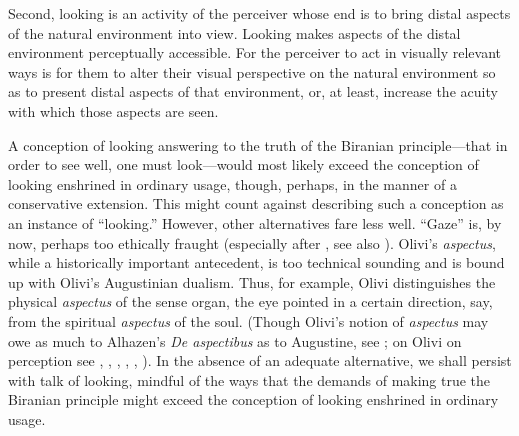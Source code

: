 Second, looking is an activity of the perceiver whose end is to bring distal aspects of the natural environment into view. Looking makes aspects of the distal environment perceptually accessible. For the perceiver to act in visually relevant ways is for them to alter their visual perspective on the natural environment so as to present distal aspects of that environment, or, at least, increase the acuity with which those aspects are seen. 

A conception of looking answering to the truth of the Biranian principle---that in order to see well, one must look---would most likely exceed the conception of looking enshrined in ordinary usage, though, perhaps, in the manner of a conservative extension. This might count against describing such a conception as an instance of ``looking.'' However, other alternatives fare less well. ``Gaze'' is, by now, perhaps too ethically fraught (especially after \citealt{Mulvey:1975aa}, see also \citealt{Jay:1994aa}). Olivi's \emph{aspectus}, while a historically important antecedent, is too technical sounding and is bound up with Olivi's Augustinian dualism. Thus, for example, Olivi distinguishes the physical \emph{aspectus} of the sense organ, the eye pointed in a certain direction, say, from the spiritual \emph{aspectus} of the soul. (Though Olivi's notion of \emph{aspectus} may owe as much to Alhazen's \emph{De aspectibus} as to Augustine, see \citealt[41 especially n. 43]{Tachau:1988aa}; on Olivi on perception see \citealt[3--26, 39--54]{Tachau:1988aa}, \citealt[215--224]{Spruit:1994qq}, \citealt[121--124, 130--134, 168--181]{Pasnau:1997aa}, \citealt[part 1]{Toivanen:2009zf}, \citealt{Silva:2010zh}, \citealt[part 2]{Toivanen:2013ul}). In the absence of an adequate alternative, we shall persist with talk of looking, mindful of the ways that the demands of making true the Biranian principle might exceed the conception of looking enshrined in ordinary usage.

